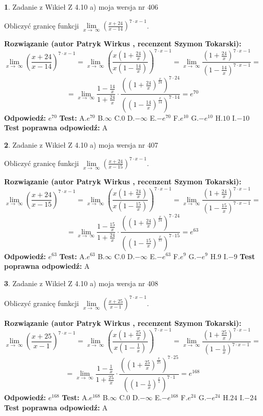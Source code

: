 \documentclass[12pt, a4paper]{article}
\theoremstyle{definition} %
\newtheorem{zad}{}
\newcommand{\zadStart}[1]{\begin{zad}#1\newline}
\newcommand{\zadStop}{\end{zad}}
\newcommand{\rozwStart}[2]{\noindent \textbf{Rozwiązanie (autor #1 , recenzent #2): }\newline}
\newcommand{\rozwStop}{\newline}
\newcommand{\odpStart}{\noindent \textbf{Odpowiedź:}\newline}
\newcommand{\odpStop}{\newline}
\newcommand{\testStart}{\noindent \textbf{Test:}\newline}
\newcommand{\testStop}{\newline}
\newcommand{\kluczStart}{\noindent \textbf{Test poprawna odpowiedź:}\newline}
\newcommand{\kluczStop}{\newline}
\begin{document}
\zadStart{Zadanie z Wikieł Z 4.10 a) moja wersja nr 406}

Obliczyć granicę funkcji  $\lim\limits_{x\to\ \infty}(\frac{x+24}{x-14})^{7\cdot x-1}$.
\zadStop
\rozwStart{Patryk Wirkus}{Szymon Tokarski}
$$\lim\limits_{x\to\ \infty}(\frac{x+24}{x-14})^{7\cdot x-1} = \lim\limits_{x\to\ \infty}(\frac{x(1+\frac{24}{x})}{x(1-\frac{14}{x})})^{7\cdot x-1}=\lim\limits_{x\to\ \infty}\frac{(1+\frac{24}{x})^{7\cdot x-1}}{(1-\frac{14}{x})^{7\cdot x-1}}=$$
$$=\lim\limits_{x\to\ \infty}\frac{1-\frac{14}{x}}{1+\frac{24}{x}}\cdot\frac{((1+\frac{24}{x})^{\frac{x}{24}})^{7\cdot24}}{((1-\frac{14}{x})^{\frac{x}{14}})^{7\cdot14}}=e^{70}$$
\rozwStop
\odpStart
$e^{70}$
\odpStop
\testStart
A.$e^{70}$ B.$\infty$ C.$0$ D.$-\infty$ E.$-e^{70}$
F.$e^{10}$ G.$-e^{10}$
H.$10$
I.$-10$
\testStop
\kluczStart
A
\kluczStop



\zadStart{Zadanie z Wikieł Z 4.10 a) moja wersja nr 407}

Obliczyć granicę funkcji  $\lim\limits_{x\to\ \infty}(\frac{x+24}{x-15})^{7\cdot x-1}$.
\zadStop
\rozwStart{Patryk Wirkus}{Szymon Tokarski}
$$\lim\limits_{x\to\ \infty}(\frac{x+24}{x-15})^{7\cdot x-1} = \lim\limits_{x\to\ \infty}(\frac{x(1+\frac{24}{x})}{x(1-\frac{15}{x})})^{7\cdot x-1}=\lim\limits_{x\to\ \infty}\frac{(1+\frac{24}{x})^{7\cdot x-1}}{(1-\frac{15}{x})^{7\cdot x-1}}=$$
$$=\lim\limits_{x\to\ \infty}\frac{1-\frac{15}{x}}{1+\frac{24}{x}}\cdot\frac{((1+\frac{24}{x})^{\frac{x}{24}})^{7\cdot24}}{((1-\frac{15}{x})^{\frac{x}{15}})^{7\cdot15}}=e^{63}$$
\rozwStop
\odpStart
$e^{63}$
\odpStop
\testStart
A.$e^{63}$ B.$\infty$ C.$0$ D.$-\infty$ E.$-e^{63}$
F.$e^{9}$ G.$-e^{9}$
H.$9$
I.$-9$
\testStop
\kluczStart
A
\kluczStop



\zadStart{Zadanie z Wikieł Z 4.10 a) moja wersja nr 408}

Obliczyć granicę funkcji  $\lim\limits_{x\to\ \infty}(\frac{x+25}{x-1})^{7\cdot x-1}$.
\zadStop
\rozwStart{Patryk Wirkus}{Szymon Tokarski}
$$\lim\limits_{x\to\ \infty}(\frac{x+25}{x-1})^{7\cdot x-1} = \lim\limits_{x\to\ \infty}(\frac{x(1+\frac{25}{x})}{x(1-\frac{1}{x})})^{7\cdot x-1}=\lim\limits_{x\to\ \infty}\frac{(1+\frac{25}{x})^{7\cdot x-1}}{(1-\frac{1}{x})^{7\cdot x-1}}=$$
$$=\lim\limits_{x\to\ \infty}\frac{1-\frac{1}{x}}{1+\frac{25}{x}}\cdot\frac{((1+\frac{25}{x})^{\frac{x}{25}})^{7\cdot25}}{((1-\frac{1}{x})^{\frac{x}{1}})^{7\cdot1}}=e^{168}$$
\rozwStop
\odpStart
$e^{168}$
\odpStop
\testStart
A.$e^{168}$ B.$\infty$ C.$0$ D.$-\infty$ E.$-e^{168}$
F.$e^{24}$ G.$-e^{24}$
H.$24$
I.$-24$
\testStop
\kluczStart
A
\kluczStop
\end{document}
